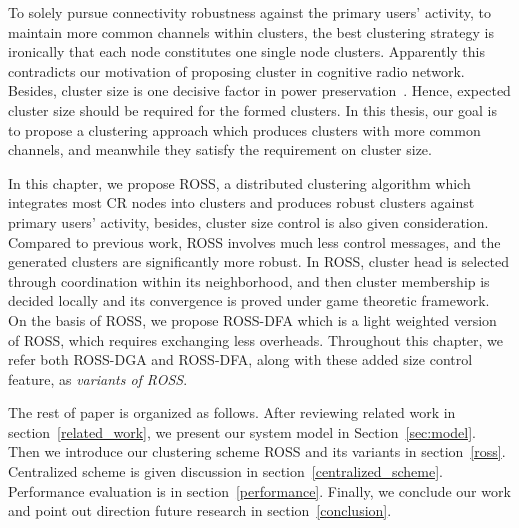 
To solely pursue connectivity robustness against the primary users' activity, \ie to maintain more common channels within clusters, the best clustering strategy is ironically that each node constitutes one single node clusters.
Apparently this contradicts our motivation of proposing cluster in cognitive radio network.
Besides, cluster size is one decisive factor in power preservation~\cite{clustering_globecom11, EnergyEfficientClusteringRouting_2015}.
Hence, expected cluster size should be required for the formed clusters.
In this thesis, our goal is to propose a clustering approach which produces clusters with more common channels, and meanwhile they satisfy the requirement on cluster size.

In this chapter, we propose ROSS, a distributed clustering algorithm which integrates most CR nodes into clusters and produces robust clusters against primary users' activity, besides, cluster size control is also given consideration.
Compared to previous work, ROSS involves much less control messages, and the generated clusters are significantly more robust.
In ROSS, cluster head is selected through coordination within its neighborhood, and then cluster membership is decided locally and its convergence is proved under game theoretic framework. 
On the basis of ROSS, we propose ROSS-DFA which is a light weighted version of ROSS, which requires exchanging less overheads.
Throughout this chapter, we refer both ROSS-DGA and ROSS-DFA, along with these added size control feature, as \textit{variants of ROSS}. 

The rest of paper is organized as follows. 
After reviewing related work in section~\ref{related_work}, we present our system model in Section~\ref{sec:model}. 
Then we introduce our clustering scheme ROSS and its variants in section~\ref{ross}.
Centralized scheme is given discussion in section~\ref{centralized_scheme}.
Performance evaluation is in section~\ref{performance}.
Finally, we conclude our work and point out direction future research in section~\ref{conclusion}.


